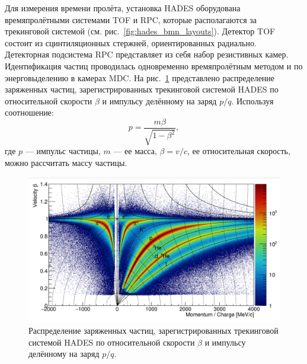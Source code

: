 Для измерения времени пролёта, установка HADES оборудована времяпролётными системами TOF и RPC, которые располагаются за трекинговой системой (см. рис.~\ref{fig:hades_bmn_layouts}).
Детектор TOF состоит из сцинтиляционных стержней, ориентированных радиально.
Детекторная подсистема RPC представляет из себя набор резистивных камер.
Идентификация частиц проводилась одновременно времяпролётным методом и по энерговыделению в камерах MDC.
На рис.~\ref{fig:hades_pid} представлено распределение заряженных частиц, зарегистрированных трекинговой системой HADES по относительной скорости $\beta$ и импульсу делённому на заряд $p/q$.
Используя соотношение:
\begin{equation}
    p = \frac{ m\beta }{ \sqrt{1-\beta^2} },
\end{equation}
где $p$ --- импульс частицы, $m$ --- ее масса, $\beta=v/c$, ее относительная скорость, можно рассчитать массу частицы.
%
\begin{figure}[ht]
    \begin{center}
    \includegraphics[width=0.95\linewidth]{images/hades_pid_plot.png}
    \caption{Распределение заряженных частиц, зарегистрированных трекинговой системой HADES по относительной скорости $\beta$ и импульсу делённому на заряд $p/q$.}
    \label{fig:hades_pid}
    \end{center}
    \end{figure}
    
